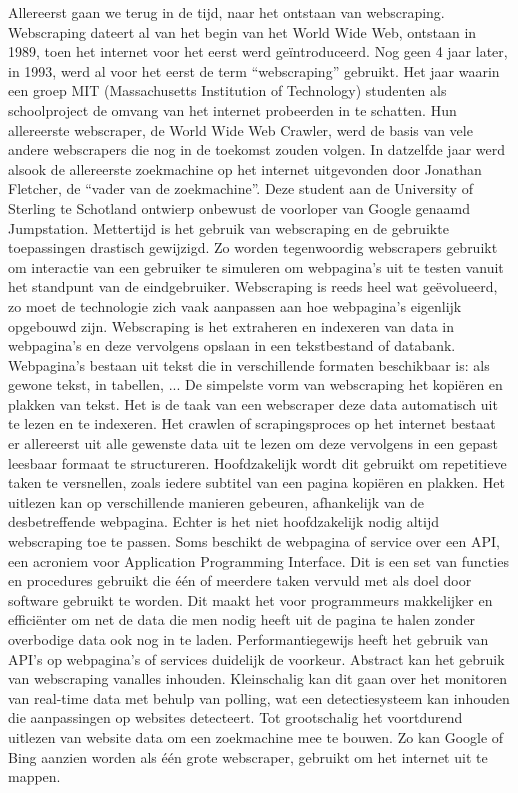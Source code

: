 Allereerst gaan we terug in de tijd, naar het ontstaan van webscraping. Webscraping dateert al van het begin van het World Wide Web, ontstaan in 1989, toen het internet voor het eerst werd geïntroduceerd. Nog geen 4 jaar later, in 1993, werd al voor het eerst de term “webscraping” gebruikt. Het jaar waarin een groep MIT (Massachusetts Institution of Technology) studenten als schoolproject de omvang van het internet probeerden in te schatten. Hun allereerste webscraper, de World Wide Web Crawler, werd de basis van vele andere webscrapers die nog in de toekomst zouden volgen. In datzelfde jaar werd alsook de allereerste zoekmachine op het internet uitgevonden door Jonathan Fletcher, de “vader van de zoekmachine”. Deze student aan de University of Sterling te Schotland ontwierp onbewust de voorloper van Google genaamd Jumpstation. \autocite{farholt2021less} Mettertijd is het gebruik van webscraping en de gebruikte toepassingen drastisch gewijzigd. Zo worden tegenwoordig webscrapers gebruikt om interactie van een gebruiker te simuleren om webpagina’s uit te testen vanuit het standpunt van de eindgebruiker.
Webscraping is reeds heel wat geëvolueerd, zo moet de technologie zich vaak aanpassen aan hoe webpagina’s eigenlijk opgebouwd zijn.
Webscraping is het extraheren en indexeren van data in webpagina’s en deze vervolgens opslaan in een tekstbestand of databank. Webpagina’s bestaan uit tekst die in verschillende formaten beschikbaar is: als gewone tekst, in tabellen, ... De simpelste vorm van webscraping het kopiëren en plakken van tekst. Het is de taak van een webscraper deze data automatisch uit te lezen en te indexeren. Het crawlen of scrapingsproces op het internet bestaat er allereerst uit alle gewenste data uit te lezen om deze vervolgens in een gepast leesbaar formaat te structureren.\autocite{zhao2017web} Hoofdzakelijk wordt dit gebruikt om repetitieve taken te versnellen, zoals iedere subtitel van een pagina kopiëren en plakken. Het uitlezen kan op verschillende manieren gebeuren, afhankelijk van de desbetreffende webpagina. Echter is het niet hoofdzakelijk nodig altijd webscraping toe te passen. Soms beschikt de webpagina of service over een API, een acroniem voor Application Programming Interface. Dit is een set van functies en procedures gebruikt die één of meerdere taken vervuld met als doel door software gebruikt te worden. Dit maakt het voor programmeurs makkelijker en efficiënter om net de data die men nodig heeft uit de pagina te halen zonder overbodige data ook nog in te laden. Performantiegewijs heeft het gebruik van API’s op webpagina’s of services duidelijk de voorkeur. \autocite{10.2307/251584}
Abstract kan het gebruik van webscraping vanalles inhouden. Kleinschalig kan dit gaan over het monitoren van real-time data met behulp van polling, wat een detectiesysteem kan inhouden die aanpassingen op websites detecteert. Tot grootschalig het voortdurend uitlezen van website data om een zoekmachine mee te bouwen. Zo kan Google of Bing aanzien worden als één grote webscraper, gebruikt om het internet uit te mappen. \autocite{snyder2003web}


